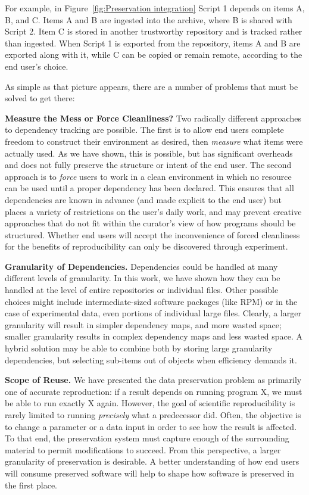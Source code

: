 \documentclass{sig-alternate}
\begin{document}
For example, in Figure~\ref{fig:Preservation integration} Script 1 depends on items A, B, and C.  Items A and B are ingested into the archive, where B is shared with Script 2.  Item C is stored in another trustworthy repository and is tracked rather than ingested.  When Script 1 is exported from the repository, items A and B are exported along with it, while C can be copied or remain remote, according to the end user's choice.

As simple as that picture appears, there are a number of problems that must be solved to get there:

{\bf Measure the Mess or Force Cleanliness?}  Two radically different approaches to dependency tracking are possible.  The first is to allow end users complete freedom to construct their environment as desired, then \emph{measure} what items were actually used.  As we have shown, this is possible, but has significant overheads and does not fully preserve the structure or intent of the end user.   The second approach is to \emph{force} users to work in a clean environment in which no resource can be used until a proper dependency has been declared.  This ensures that all dependencies are known in advance (and made explicit to the end user) but places a variety of restrictions on the user's daily work, and may prevent creative approaches that do not fit within the curator's view of how programs should be structured.  Whether end users will accept the inconvenience of forced cleanliness for the benefits of reproducibility can only be discovered through experiment.

{\bf Granularity of Dependencies.}  Dependencies could be handled
at many different levels of granularity.  In this work, we have shown
how they can be handled at the level of entire repositories or individual files.
Other possible choices might include intermediate-sized software packages
(like RPM) or in the case of experimental data, even portions of individual large files.  Clearly, a larger granularity will result in 
simpler dependency maps, and more wasted space; smaller granularity results
in complex dependency maps and less wasted space.  A hybrid solution may
be able to combine both by storing large granularity dependencies, but
selecting sub-items out of objects when efficiency demands it.

{\bf Scope of Reuse.}  We have presented the data preservation
problem as primarily one of accurate reproduction: if a result depends
on running program X, we must be able to run exactly X again.  However,
the goal of scientific reproducibility is rarely limited to running
\emph{precisely} what a predecessor did. Often, the objective is to
change a parameter or a data input in order to see how the result is affected.
To that end, the preservation system must capture enough of the surrounding
material to permit modifications to succeed.  From this perspective,
a larger granularity of preservation is desirable.  A better understanding of
how end users will consume preserved software will help to shape how
software is preserved in the first place.
\end{document}
